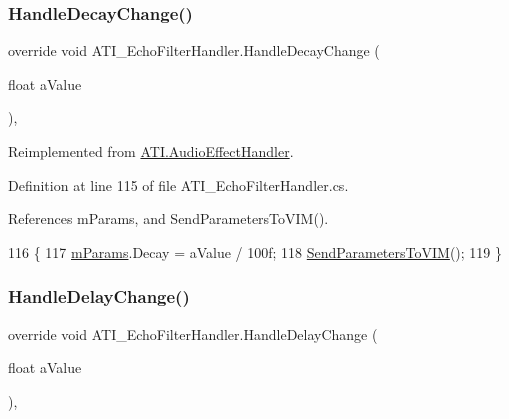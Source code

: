 \subsubsection{\texorpdfstring{Handle\+Decay\+Change()}{HandleDecayChange()}}
{\footnotesize\ttfamily override void A\+T\+I\+\_\+\+Echo\+Filter\+Handler.\+Handle\+Decay\+Change (\begin{DoxyParamCaption}\item[{float}]{a\+Value }\end{DoxyParamCaption})\hspace{0.3cm}{\ttfamily [protected]}, {\ttfamily [virtual]}}



Reimplemented from \hyperlink{class_a_t_i_1_1_audio_effect_handler_ae8a88211ac0910dc4b7752667abb2f84}{A\+T\+I.\+Audio\+Effect\+Handler}.



Definition at line 115 of file A\+T\+I\+\_\+\+Echo\+Filter\+Handler.\+cs.



References m\+Params, and Send\+Parameters\+To\+V\+I\+M().


\begin{DoxyCode}
116     \{
117         \hyperlink{class_a_t_i___echo_filter_handler_afe435170679cf364951083e6f6ffab36}{mParams}.Decay = aValue / 100f;
118         \hyperlink{class_a_t_i___echo_filter_handler_afacef95c6ac470707d2bd092031efac0}{SendParametersToVIM}();
119     \}
\end{DoxyCode}
\mbox{\label{class_a_t_i___echo_filter_handler_a33447b03218ff2945e5f8cea0f8f0d45}} 
\subsubsection{\texorpdfstring{Handle\+Delay\+Change()}{HandleDelayChange()}}
{\footnotesize\ttfamily override void A\+T\+I\+\_\+\+Echo\+Filter\+Handler.\+Handle\+Delay\+Change (\begin{DoxyParamCaption}\item[{float}]{a\+Value }\end{DoxyParamCaption})\hspace{0.3cm}{\ttfamily [protected]}, {\ttfamily [virtual]}}



